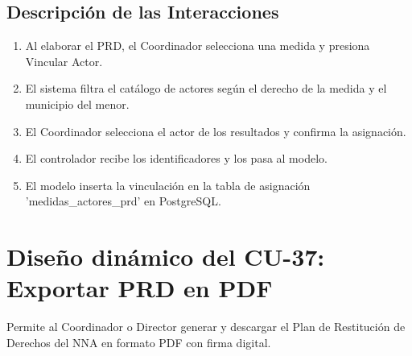 \subsection{Descripción de las Interacciones}
\begin{enumerate}
    \item Al elaborar el PRD, el Coordinador selecciona una medida y presiona Vincular Actor.
    \item El sistema filtra el catálogo de actores según el derecho de la medida y el municipio del menor.
    \item El Coordinador selecciona el actor de los resultados y confirma la asignación.
    \item El controlador recibe los identificadores y los pasa al modelo.
    \item El modelo inserta la vinculación en la tabla de asignación 'medidas\_actores\_prd' en PostgreSQL.
\end{enumerate}

\cleardoublepage
\section{Diseño dinámico del CU-37: Exportar PRD en PDF}
\label{sec:disenoDinamicoCU37}

Permite al Coordinador o Director generar y descargar el Plan de Restitución de Derechos del NNA en formato PDF con firma digital.


